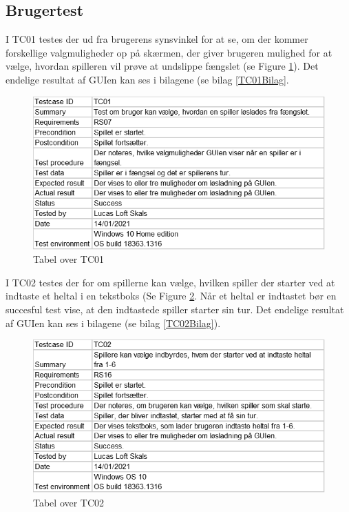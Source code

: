 \begin{flushleft}
\doublespacing
\subsection{Brugertest}

I TC01 testes der ud fra brugerens synsvinkel for at se, om der kommer forskellige valgmuligheder op på skærmen, der giver brugeren mulighed for at vælge, hvordan spilleren vil prøve at undslippe fængslet (se Figure \ref{Testcase01}). Det endelige resultat af GUIen kan ses i bilagene (se bilag \ref{TC01Bilag}.

\begin{figure}[H] %
    \centering
    \includegraphics[width=14cm]{Report/figures/Usertests/TC01.png}
    \caption{Tabel over TC01}
    \label{Testcase01}
\end{figure}

I TC02 testes der for om spillerne kan vælge, hvilken spiller der starter ved at indtaste et heltal i en tekstboks (Se Figure \ref{Testcase02}. Når et heltal er indtastet bør en succesful test vise, at den indtastede spiller starter sin tur. Det endelige resultat af GUIen kan ses i bilagene (se bilag \ref{TC02Bilag}).

\begin{figure}[H] %
    \centering
    \includegraphics[width=14cm]{Report/figures/Usertests/TC02.png}
    \caption{Tabel over TC02}
    \label{Testcase02}
\end{figure}


\end{flushleft}
